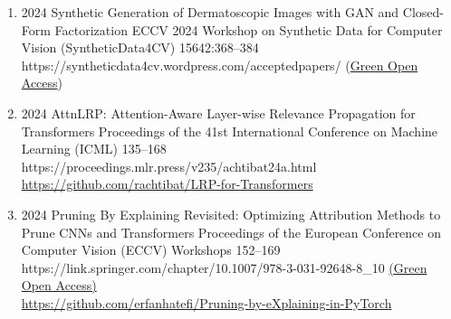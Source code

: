 {\begin{enumerate}
                        
        \item {}
                        {2024}
                        {Synthetic Generation of Dermatoscopic Images with GAN and Closed-Form Factorization}
                        {ECCV 2024 Workshop on Synthetic Data for Computer Vision (SyntheticData4CV)}
                        {15642:368--384}
                        {https://syntheticdata4cv.wordpress.com/acceptedpapers/}
                        {(\href{https://arxiv.org/abs/2410.05114}{Green Open Access})}


        \item {}
                        {2024}
                        {AttnLRP: Attention-Aware Layer-wise Relevance Propagation for Transformers}
                        {Proceedings of the 41st International Conference on Machine Learning (ICML)}
                        {135--168}
                        {https://proceedings.mlr.press/v235/achtibat24a.html}
                        {
                            \\\href{https://github.com/rachtibat/LRP-for-Transformers}{https://github.com/rachtibat/LRP-for-Transformers}
                        }

                        
        \item {}
                            {2024}
                            {Pruning By Explaining Revisited: Optimizing Attribution Methods to Prune CNNs and Transformers}
                            {Proceedings of the European Conference on Computer Vision (ECCV) Workshops}
                            {152--169}
                            {https://link.springer.com/chapter/10.1007/978-3-031-92648-8_10}
                            {
                                \href{https://excv-workshop.github.io/publication/pruning-by-explaining-revisited-optimizing-attribution-methods-to-prune-cnns-and-transformers/paper.pdf}{(Green Open Access)}
                                \\\href{https://github.com/erfanhatefi/Pruning-by-eXplaining-in-PyTorch}{https://github.com/erfanhatefi/Pruning-by-eXplaining-in-PyTorch}
                            }


\end{enumerate}}
